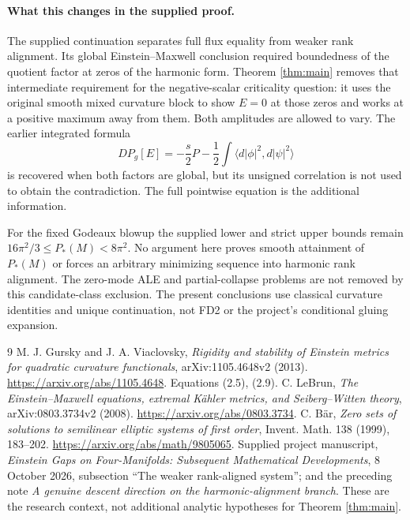 \documentclass[11pt,a4paper]{article}
\theoremstyle{remark}\newtheorem{remark}[theorem]{Remark}
\newcommand{\ip}[2]{\langle #1,#2\rangle}
\numberwithin{equation}{section}
\begin{document}
\paragraph{What this changes in the supplied proof.}
The supplied continuation \cite{Project} separates full flux equality from
weaker rank alignment. Its global Einstein--Maxwell conclusion required
boundedness of the quotient factor at zeros of the harmonic form. Theorem
\ref{thm:main} removes that intermediate requirement for the negative-scalar
criticality question: it uses the original smooth mixed curvature block to
show $E=0$ at those zeros and works at a positive maximum away from them.
Both amplitudes are allowed to vary. The earlier integrated formula
\[
 DP_g[E]=-\frac{s}{2}P-\frac12\int
       \ip{d|\phi|^2}{d|\psi|^2}
\]
is recovered when both factors are global, but its unsigned correlation is
not used to obtain the contradiction. The full pointwise equation is the
additional information.

For the fixed Godeaux blowup the supplied lower and strict upper bounds
remain $16\pi^2/3\le P_*(M)<8\pi^2$. No argument here proves smooth
attainment of $P_*(M)$ or forces an arbitrary minimizing sequence into
harmonic rank alignment. The zero-mode ALE and partial-collapse problems
are not removed by this candidate-class exclusion. The present conclusions
use classical curvature identities and unique continuation, not FD2 or the
project's conditional gluing expansion.

\begin{thebibliography}{9}
 M. J. Gursky and J. A. Viaclovsky,
\emph{Rigidity and stability of Einstein metrics for quadratic curvature
functionals}, arXiv:1105.4648v2 (2013).
\url{https://arxiv.org/abs/1105.4648}. Equations (2.5), (2.9).
 C. LeBrun,
\emph{The Einstein--Maxwell equations, extremal K\"ahler metrics, and
Seiberg--Witten theory}, arXiv:0803.3734v2 (2008).
\url{https://arxiv.org/abs/0803.3734}.
 C. B\"ar,
\emph{Zero sets of solutions to semilinear elliptic systems of first order},
Invent. Math. 138 (1999), 183--202.
\url{https://arxiv.org/abs/math/9805065}.
 Supplied project manuscript,
\emph{Einstein Gaps on Four-Manifolds: Subsequent Mathematical Developments},
8 October 2026, subsection ``The weaker rank-aligned system'';
and the preceding note \emph{A genuine descent direction on the
harmonic-alignment branch}. These are the research context, not additional
analytic hypotheses for Theorem \ref{thm:main}.
\end{thebibliography}
\end{document}
